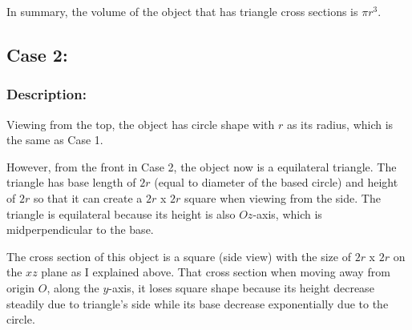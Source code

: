 \documentclass[12pt]{article}
\begin{document}
\noindent In summary, the volume of the object that has triangle cross sections is $\pi r^3$.


\vspace{1cm}

\subsection*{Case 2:}
    
\subsubsection*{Description:}

\noindent Viewing from the top, the object has circle shape with $r$ as its radius, which is the same as Case 1.
        
\noindent However, from the front in Case 2, the object now is a equilateral triangle. The triangle has base length of $2r$ (equal to diameter of the based circle) and height of $2r$ so that it can create a $2r$ x $2r$ square when viewing from the side. The triangle is equilateral because its height is also $Oz$-axis, which is midperpendicular to the base.
        
\noindent The cross section of this object is a square (side view) with the size of $2r$ x $2r$ on the $xz$ plane as I explained above. That cross section when moving away from origin $O$, along the $y$-axis, it loses square shape because its height decrease steadily due to triangle's side while its base decrease exponentially due to the circle.
    
\begin{center}
\end{center}
\end{document}
